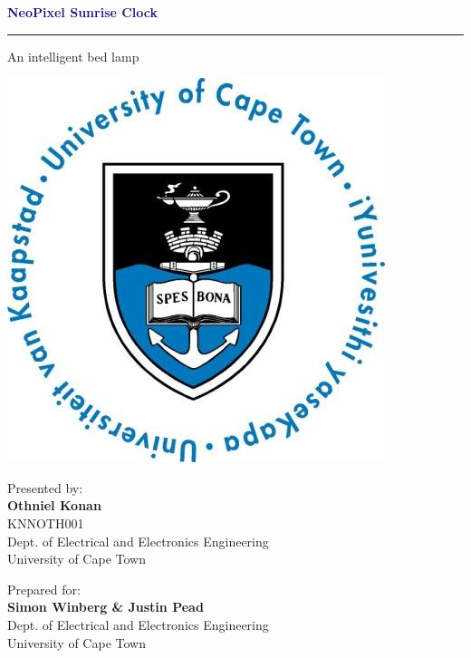 \thispagestyle{empty}
{\Huge \begin{center}
\textcolor{MidnightBlue}{\textbf{NeoPixel Sunrise Clock}}
\vskip 1mm
\color{MidnightBlue} \hrule
{\Large An intelligent bed lamp}
\end{center}}

\vskip 5mm
\begin{center}
\includegraphics[scale = 0.3]{uctLogo.png}
\end{center}

\vskip 5mm
\begin{center}
Presented by:\\
\textbf{Othniel Konan}\\		%
KNNOTH001\\
Dept. of Electrical and Electronics Engineering\\University of Cape Town

\end{center}

\vskip 10mm
\begin{center}
Prepared for:\\
\textbf{Simon Winberg \& Justin Pead}\\ 		%
Dept. of Electrical and Electronics Engineering\\University of Cape Town
\end{center}


